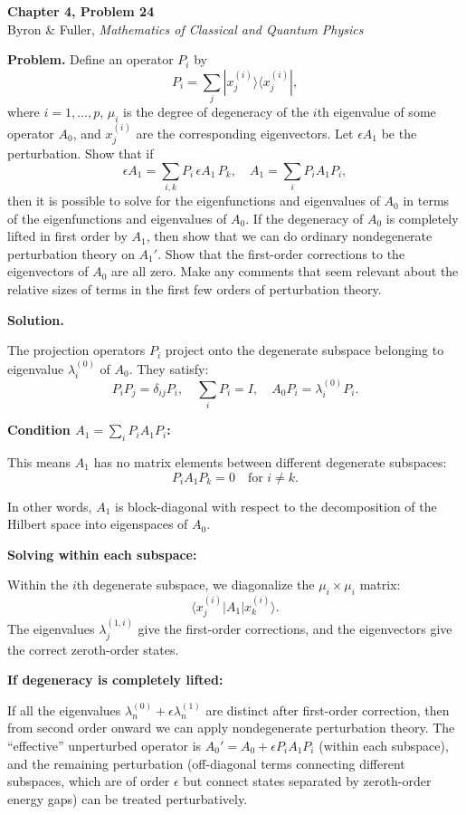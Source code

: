 \documentclass[12pt]{article}
\begin{document}
\begin{center}
{\Large\bfseries Chapter 4, Problem 24}\\[6pt]
Byron \& Fuller, \textit{Mathematics of Classical and Quantum Physics}
\end{center}

\bigskip

\textbf{Problem.} Define an operator $P_i$ by
\[
P_i = \sum_j |x_j^{(i)}\rangle\langle x_j^{(i)}|,
\]
where $i = 1, \ldots, p$, $\mu_i$ is the degree of degeneracy of the $i$th eigenvalue of some operator $A_0$, and $x_j^{(i)}$ are the corresponding eigenvectors. Let $\epsilon A_1$ be the perturbation. Show that if
\[
\epsilon A_1 = \sum_{i,k} P_i\, \epsilon A_1\, P_k, \quad A_1 = \sum_i P_i A_1 P_i,
\]
then it is possible to solve for the eigenfunctions and eigenvalues of $A_0$ in terms of the eigenfunctions and eigenvalues of $A_0$. If the degeneracy of $A_0$ is completely lifted in first order by $A_1$, then show that we can do ordinary nondegenerate perturbation theory on $A_1'$. Show that the first-order corrections to the eigenvectors of $A_0$ are all zero. Make any comments that seem relevant about the relative sizes of terms in the first few orders of perturbation theory.

\bigskip
\textbf{Solution.}

The projection operators $P_i$ project onto the degenerate subspace belonging to eigenvalue $\lambda_i^{(0)}$ of $A_0$. They satisfy:
\[
P_i P_j = \delta_{ij} P_i, \quad \sum_i P_i = I, \quad A_0 P_i = \lambda_i^{(0)} P_i.
\]

\textbf{Condition $A_1 = \sum_i P_i A_1 P_i$:}

This means $A_1$ has no matrix elements between different degenerate subspaces:
\[
P_i A_1 P_k = 0 \quad \text{for } i \neq k.
\]

In other words, $A_1$ is block-diagonal with respect to the decomposition of the Hilbert space into eigenspaces of $A_0$.

\textbf{Solving within each subspace:}

Within the $i$th degenerate subspace, we diagonalize the $\mu_i \times \mu_i$ matrix:
\[
\langle x_j^{(i)}|A_1|x_k^{(i)}\rangle.
\]
The eigenvalues $\lambda_{j}^{(1,i)}$ give the first-order corrections, and the eigenvectors give the correct zeroth-order states.

\textbf{If degeneracy is completely lifted:}

If all the eigenvalues $\lambda_n^{(0)} + \epsilon\lambda_n^{(1)}$ are distinct after first-order correction, then from second order onward we can apply nondegenerate perturbation theory. The ``effective'' unperturbed operator is $A_0' = A_0 + \epsilon P_i A_1 P_i$ (within each subspace), and the remaining perturbation (off-diagonal terms connecting different subspaces, which are of order $\epsilon$ but connect states separated by zeroth-order energy gaps) can be treated perturbatively.
\end{document}
